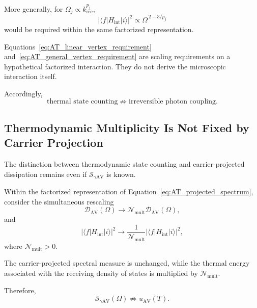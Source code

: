 More generally, for
\(\Omega_j\propto k_{\mathrm{rec}}^{p_j}\),
\begin{equation}
    \left|
        \langle f|
        H_{\mathrm{int}}
        |i\rangle
    \right|^2
    \propto
    \Omega^{\,2-3/p_j}
    \label{eq:AT_general_vertex_requirement}
\end{equation}
would be required within the same factorized representation.

Equations~\eqref{eq:AT_linear_vertex_requirement}
and~\eqref{eq:AT_general_vertex_requirement}
are scaling requirements on a hypothetical factorized interaction.
They do not derive the microscopic interaction itself.

Accordingly,
\begin{equation}
    \text{thermal state counting}
    \not\Rightarrow
    \text{irreversible photon coupling}.
    \label{eq:AT_state_count_not_coupling}
\end{equation}


\subsection{Thermodynamic Multiplicity Is Not Fixed by Carrier Projection}

The distinction between thermodynamic state counting and carrier-projected
dissipation remains even if
\(\mathcal S_{\gamma\mathrm{AV}}\)
is known.

Within the factorized representation of
Equation~\eqref{eq:AT_projected_spectrum},
consider the simultaneous rescaling
\begin{equation}
    \mathcal D_{\mathrm{AV}}(\Omega)
    \longrightarrow
    \mathcal N_{\mathrm{mult}}
    \mathcal D_{\mathrm{AV}}(\Omega),
\end{equation}
and
\begin{equation}
    \left|
        \langle f|
        H_{\mathrm{int}}
        |i\rangle
    \right|^2
    \longrightarrow
    \frac{1}{\mathcal N_{\mathrm{mult}}}
    \left|
        \langle f|
        H_{\mathrm{int}}
        |i\rangle
    \right|^2,
\end{equation}
where
\(\mathcal N_{\mathrm{mult}}>0\).

The carrier-projected spectral measure is unchanged, while the thermal energy
associated with the receiving density of states is multiplied by
\(\mathcal N_{\mathrm{mult}}\).

Therefore,
\begin{equation}
    \mathcal S_{\gamma\mathrm{AV}}(\Omega)
    \not\Rightarrow
    u_{\mathrm{AV}}(T).
    \label{eq:AT_spectrum_not_thermal_energy}
\end{equation}

